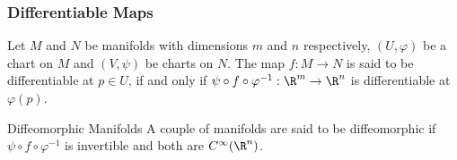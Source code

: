 \begin{frame}
  \frametitle{Differentiable Maps}
  Let $M$ and $N$ be manifolds with dimensions $m$ and $n$ respectively,  $(U,\varphi)$ be a chart on $M$ and $(V,\psi)$ be charts on $N$. The map $f:M\to N$ is said to be differentiable at $p\in U$, if and only if $\psi\circ f\circ \varphi^{-1}:\R^m\to \R^n$ is differentiable at $\varphi(p)$.

  \begin{alertblock}{Diffeomorphic Manifolds}
  A couple of manifolds are said to be diffeomorphic if $\psi\circ f\circ \varphi^{-1}$ is invertible and both are $C^\infty(\R^n)$.
  \end{alertblock}
  
\end{frame}
